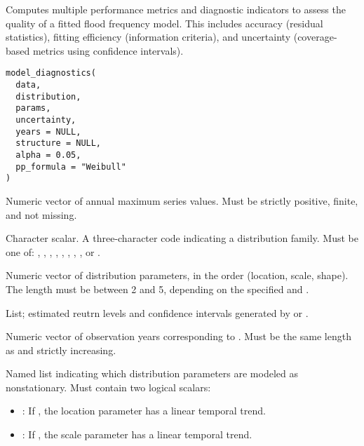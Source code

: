 \documentclass[a4paper]{book}
\begin{document}
%
\begin{Description}
Computes multiple performance metrics and diagnostic indicators to assess the
quality of a fitted flood frequency model. This includes accuracy (residual
statistics), fitting efficiency (information criteria), and uncertainty
(coverage-based metrics using confidence intervals).
\end{Description}
%
\begin{Usage}
\begin{verbatim}
model_diagnostics(
  data,
  distribution,
  params,
  uncertainty,
  years = NULL,
  structure = NULL,
  alpha = 0.05,
  pp_formula = "Weibull"
)
\end{verbatim}
\end{Usage}
%
\begin{Arguments}
\begin{ldescription}
\item[\code{data}] Numeric vector of annual maximum series values.
Must be strictly positive, finite, and not missing.

\item[\code{distribution}] Character scalar. A three-character code indicating
a distribution family. Must be one of: , , ,
, , , , , or .

\item[\code{params}] Numeric vector of distribution parameters, in the order (location,
scale, shape). The length must be between 2 and 5, depending on the specified
 and .

\item[\code{uncertainty}] List; estimated reutrn levels and confidence intervals
generated by  or .

\item[\code{years}] Numeric vector of observation years corresponding to .
Must be the same length as  and strictly increasing.

\item[\code{structure}] Named list indicating which distribution parameters are
modeled as nonstationary. Must contain two logical scalars:
\begin{itemize}

\item{} : If , the location parameter has a linear temporal trend.
\item{} : If , the scale parameter has a linear temporal trend.


\end{itemize}
\end{ldescription}
\end{Arguments}
\end{document}

